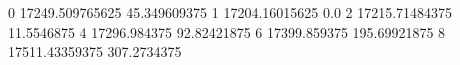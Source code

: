 0 17249.509765625 45.349609375
1 17204.16015625 0.0
2 17215.71484375 11.5546875
4 17296.984375 92.82421875
6 17399.859375 195.69921875
8 17511.43359375 307.2734375
